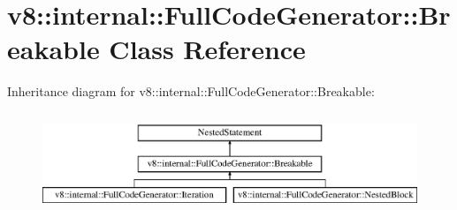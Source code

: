 \hypertarget{classv8_1_1internal_1_1_full_code_generator_1_1_breakable}{}\section{v8\+:\+:internal\+:\+:Full\+Code\+Generator\+:\+:Breakable Class Reference}
\label{classv8_1_1internal_1_1_full_code_generator_1_1_breakable}
Inheritance diagram for v8\+:\+:internal\+:\+:Full\+Code\+Generator\+:\+:Breakable\+:\begin{figure}[H]
\begin{center}
\leavevmode
\includegraphics[height=3.000000cm]{classv8_1_1internal_1_1_full_code_generator_1_1_breakable}
\end{center}
\end{figure}
